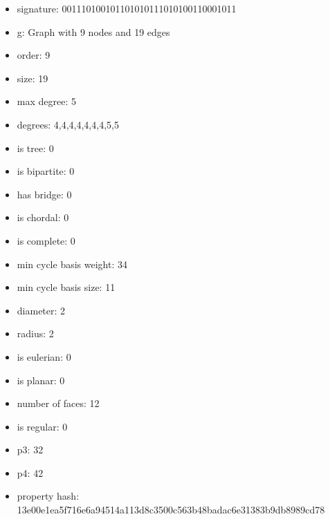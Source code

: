 \newpage
\begin{figure}
\end{figure}
\begin{itemize}
\item signature: 001110100101101010111010100110001011
\item g: Graph with 9 nodes and 19 edges
\item order: 9
\item size: 19
\item max degree: 5
\item degrees: 4,4,4,4,4,4,4,5,5
\item is tree: 0
\item is bipartite: 0
\item has bridge: 0
\item is chordal: 0
\item is complete: 0
\item min cycle basis weight: 34
\item min cycle basis size: 11
\item diameter: 2
\item radius: 2
\item is eulerian: 0
\item is planar: 0
\item number of faces: 12
\item is regular: 0
\item p3: 32
\item p4: 42
\item property hash: 13e00e1ea5f716e6a94514a113d8c3500c563b48badac6e31383b9db8989cd78
\end{itemize}

